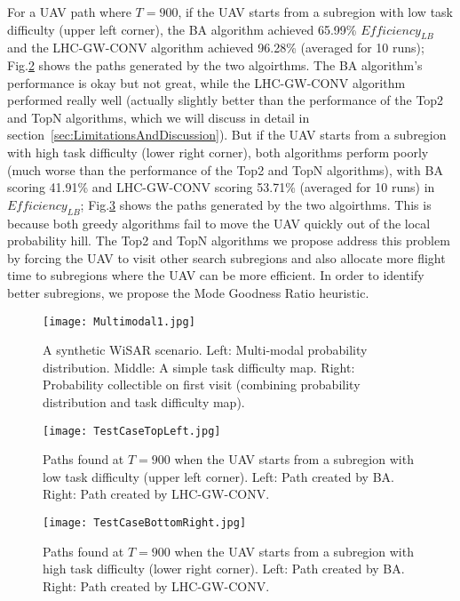 \documentclass[journal]{IEEEtran}
\begin{document}
For a UAV path where $T=900$, if the UAV starts from a subregion with low task difficulty (upper left corner), the BA algorithm achieved 65.99\% $\mathit{Efficiency_{LB}}$ and the LHC-GW-CONV algorithm achieved 96.28\% (averaged for 10 runs); Fig.\ref{SyntheticCasePaths1} shows the paths generated by the two algoirthms. The BA algorithm's performance is okay but not great, while the LHC-GW-CONV algorithm performed really well (actually slightly better than the performance of the Top2 and TopN algorithms, which we will discuss in detail in section~\ref{sec:LimitationsAndDiscussion}). But if the UAV starts from a subregion with high task difficulty (lower right corner), both algorithms perform poorly (much worse than the performance of the Top2 and TopN algorithms), with BA scoring 41.91\% and LHC-GW-CONV scoring 53.71\% (averaged for 10 runs) in $\mathit{Efficiency_{LB}}$; Fig.\ref{SyntheticCasePaths2} shows the paths generated by the two algoirthms. This is because both greedy algorithms fail to move the UAV quickly out of the local probability hill. The Top2 and TopN algorithms we propose address this problem by forcing the UAV to visit other search subregions and also allocate more flight time to subregions where the UAV can be more efficient. In order to identify better subregions, we propose the Mode Goodness Ratio heuristic.
\begin{figure}
\centering
\texttt{[image: Multimodal1.jpg]}
\caption{A synthetic WiSAR scenario. Left: Multi-modal probability distribution. Middle: A simple task difficulty map. Right: Probability collectible on first visit (combining probability distribution and task difficulty map).}
\label{SyntheticCase}
\end{figure}

\begin{figure}
\centering
\texttt{[image: TestCaseTopLeft.jpg]}
\caption{Paths found at $T=900$ when the UAV starts from a subregion with low task difficulty (upper left corner). Left: Path created by BA. Right: Path created by LHC-GW-CONV.}
\label{SyntheticCasePaths1}
\end{figure}

\begin{figure}
\centering
\texttt{[image: TestCaseBottomRight.jpg]}
\caption{Paths found at $T=900$ when the UAV starts from a subregion with high task difficulty (lower right corner). Left: Path created by BA. Right: Path created by LHC-GW-CONV.}
\label{SyntheticCasePaths2}
\end{figure}
\end{document}
